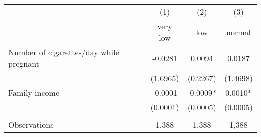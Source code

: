 \begin{tabular}{l *{3}{c}}
\toprule
                    &         (1)   &         (2)   &         (3)   \\
 & very low & low & normal \\
\midrule
Number of cigarettes/day while pregnant&     -0.0281   &      0.0094   &      0.0187   \\
                    &    (1.6965)   &    (0.2267)   &    (1.4698)   \\
Family income       &     -0.0001   &     -0.0009*  &      0.0010*  \\
                    &    (0.0001)   &    (0.0005)   &    (0.0005)   \\
\\
Observations        &       1,388   &       1,388   &       1,388   \\
\bottomrule
\end{tabular}
